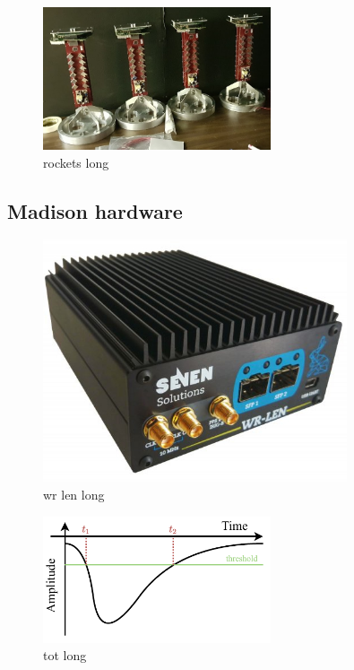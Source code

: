 \begin{figure} %
    \includegraphics[width=0.6\textwidth]{diagrams/5-daq/rockets.jpg}
    \caption[rockets short]
    {rockets long}
    \label{fig:rockets}
\end{figure}

\subsection{Madison hardware} %
\label{sec:daq_hard_madison} %

\begin{figure} %
    \includegraphics[width=0.8\textwidth]{diagrams/5-daq/wr_len.jpg}
    \caption[wr len short]
    {wr len long}
    \label{fig:wr_len}
\end{figure}

\begin{figure} %
    \includegraphics[width=0.6\textwidth]{diagrams/5-daq/tot.pdf}
    \caption[tot short]
    {tot long}
    \label{fig:tot}
\end{figure}

